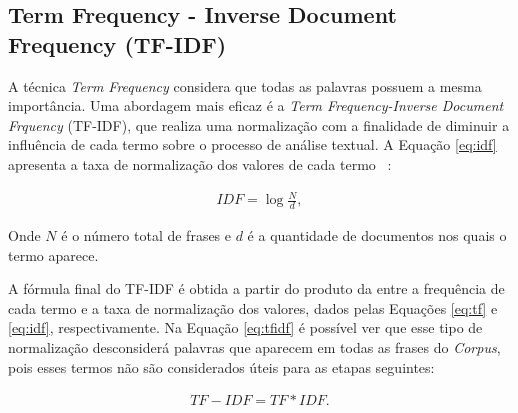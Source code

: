             \subsection{Term Frequency - Inverse Document Frequency (TF-IDF)}
            \label{sec:tfidf}

            A técnica \textit{Term Frequency} considera que todas as palavras possuem a mesma importância. Uma abordagem mais eficaz é a \textit{Term Frequency-Inverse Document Frquency} (TF-IDF), 
            que realiza uma normalização 
            com a finalidade de diminuir a influência de cada termo sobre o processo de análise textual. 
            A Equação \ref{eq:idf} apresenta a taxa de normalização dos valores de cada termo ~\cite{sparck1972statistical}:
               

               \begin{equation}\label{eq:idf}
                \begin{aligned}
                  IDF = \log \frac{N}{d},
              \end{aligned} 
              \end{equation}
               
              Onde $N$ é o número total de frases e $d$ é a quantidade de documentos nos quais o termo aparece.


              A fórmula final do TF-IDF é obtida a partir do produto da entre a frequência de cada termo e a taxa de normalização dos valores, dados pelas Equações \ref{eq:tf} e \ref{eq:idf}, respectivamente. Na Equação \ref{eq:tfidf} é possível ver que esse tipo de normalização desconsiderá
              palavras que aparecem em todas as frases do \textit{Corpus}, pois esses termos não são considerados úteis para as etapas seguintes:
              
              

              \begin{equation}\label{eq:tfidf}
                \begin{aligned}
                  TF-IDF = TF*IDF.
              \end{aligned} 
              \end{equation}
               


